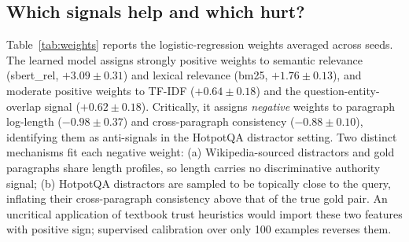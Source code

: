 \subsection*{Which signals help and which hurt?}

Table~\ref{tab:weights} reports the logistic-regression weights averaged
across seeds. The learned model assigns strongly positive weights to
semantic relevance (sbert\_rel, $+3.09 \pm 0.31$) and lexical relevance
(bm25, $+1.76 \pm 0.13$), and moderate positive weights to TF-IDF
($+0.64 \pm 0.18$) and the question-entity-overlap signal
($+0.62 \pm 0.18$). Critically, it assigns \emph{negative} weights to
paragraph log-length ($-0.98 \pm 0.37$) and cross-paragraph consistency
($-0.88 \pm 0.10$), identifying them as anti-signals in the HotpotQA
distractor setting. Two distinct mechanisms fit each negative weight:
(a) Wikipedia-sourced distractors and gold paragraphs share length
profiles, so length carries no discriminative authority signal; (b)
HotpotQA distractors are sampled to be topically close to the query,
inflating their cross-paragraph consistency above that of the true gold
pair. An uncritical application of textbook trust heuristics would
import these two features with positive sign; supervised calibration
over only 100 examples reverses them.

\begin{table}[!tbp]
\centering
\footnotesize
\setlength{\tabcolsep}{3pt}
\caption{Mean logistic-regression weights for Learned-TrustScore across three seeds, 100 training questions per seed. Positive weights contribute toward ``gold''; negative weights are learned as anti-signals. Bolded rows have $|\bar w| > 0.8$ and consistent sign across every seed.}
\label{tab:weights}
\end{table}

